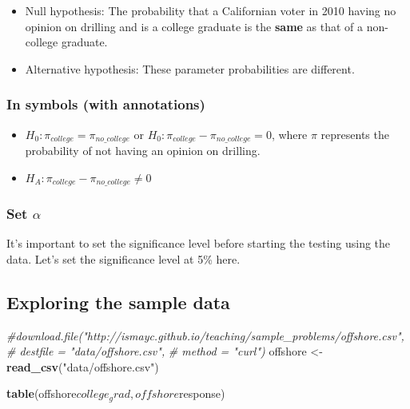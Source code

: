 \documentclass[]{tufte-book}
\newenvironment{Shaded}{\begin{snugshade}}{\end{snugshade}}
\newcommand{\KeywordTok}[1]{\textcolor[rgb]{0.13,0.29,0.53}{\textbf{{#1}}}}
\newcommand{\StringTok}[1]{\textcolor[rgb]{0.31,0.60,0.02}{{#1}}}
\newcommand{\CommentTok}[1]{\textcolor[rgb]{0.56,0.35,0.01}{\textit{{#1}}}}
\newcommand{\NormalTok}[1]{{#1}}
\providecommand{\tightlist}{%
  \setlength{\itemsep}{0pt}\setlength{\parskip}{0pt}}
\begin{document}
\begin{itemize}
\item
  Null hypothesis: The probability that a Californian voter in 2010
  having no opinion on drilling and is a college graduate is the
  \textbf{same} as that of a non-college graduate.
\item
  Alternative hypothesis: These parameter probabilities are different.
\end{itemize}

\subsubsection{In symbols (with
annotations)}\label{in-symbols-with-annotations-2}

\begin{itemize}
\tightlist
\item
  \(H_0: \pi_{college} = \pi_{no\_college}\) or
  \(H_0: \pi_{college} - \pi_{no\_college} = 0\), where \(\pi\)
  represents the probability of not having an opinion on drilling.
\item
  \(H_A: \pi_{college} - \pi_{no\_college} \ne 0\)
\end{itemize}

\subsubsection{\texorpdfstring{Set
\(\alpha\)}{Set \textbackslash{}alpha}}\label{set-alpha-2}

It's important to set the significance level before starting the testing
using the data. Let's set the significance level at 5\% here.

\subsection{Exploring the sample
data}\label{exploring-the-sample-data-2}

\begin{Shaded}
\begin{Highlighting}[]
\CommentTok{#download.file("http://ismayc.github.io/teaching/sample_problems/offshore.csv",}
\CommentTok{#              destfile = "data/offshore.csv", }
\CommentTok{#              method = "curl")}
\NormalTok{offshore <-}\StringTok{ }\KeywordTok{read_csv}\NormalTok{(}\StringTok{"data/offshore.csv"}\NormalTok{)}
\end{Highlighting}
\end{Shaded}

\begin{Shaded}
\begin{Highlighting}[]
\KeywordTok{table}\NormalTok{(offshore$college_grad, offshore$response)}
\end{Highlighting}
\end{Shaded}
\end{document}
